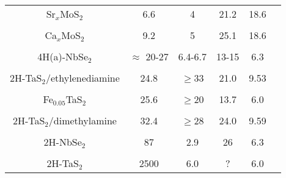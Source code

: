 \begin{table}
\begin{center}
\begin{tabular}{|c|ccccc|}
Sr$ _x$MoS$_2$ & 6.6 & 4 & 21.2 & 18.6 & \cite{woollam76,somoano75}\\
& & & & & \\
Ca$ _x$MoS$_2$ & 9.2 & 5 & 25.1 & 18.6 & \cite{woollam76,somoano75}\\
& & & & & \\
4H(a)-NbSe$_2$ & $\approx$ 20-27& 6.4-6.7& 13-15& 6.3  & \cite{ikebe80}\\
& & & & & \\
2H-TaS$_2$/ethylenediamine & 24.8 & $\geq$33 & 21.0 & 9.53 & \cite{coleman83}\\
& & & & & \\
Fe$_{0.05}$TaS$_2$& 25.6 & $\geq$20 & 13.7 & 6.0 & \cite{coleman83}\\
& & & & & \\
2H-TaS$_2$/dimethylamine & 32.4 & $\geq$28 & 24.0 & 9.59 & \cite{coleman83}\\
& & & & & \\
2H-NbSe$_2$ & 87& 2.9& 26 & 6.3  & \cite{prober80}\\
& & & & & \\
2H-TaS$_2$ & 2500& 6.0 & ?  &6.0 & \cite{muto78,coleman83} \\
\hline
\end{tabular}
\end{center}
\end{table}

